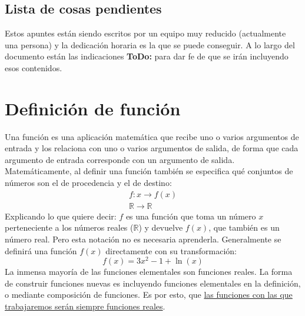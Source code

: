 \documentclass[sans]{apuntes}
\begin{document}
\subsection*{Lista de cosas pendientes}
Estos apuntes están siendo escritos por un equipo muy reducido (actualmente una persona) y la dedicación horaria es la que se puede conseguir. A lo largo del documento están las indicaciones \textbf{ToDo:} para dar fe de que se irán incluyendo esos contenidos.

\newpage
\section{Definición de función} %
Una función es una aplicación matemática que recibe uno o varios argumentos de entrada y los relaciona con uno o varios argumentos de salida, de forma que cada argumento de entrada corresponde con un argumento de salida. Matemáticamente, al definir una función también se especifica qué conjuntos de números son el de procedencia y el de destino:
\[\begin{array}{c} f: x \to f(x) \\
		\mathbb{R} \to \mathbb{R}\end{array}\]
Explicando lo que quiere decir: $f$ es una función que toma un número $x$ perteneciente a los números reales ($\mathbb{R}$) y devuelve $f(x)$, que también es un número real. Pero esta notación no es necesaria aprenderla. Generalmente se definirá una función $f(x)$ directamente con su transformación:
\[f(x) = 3x^2 - 1 + \ln(x)\]
La inmensa mayoría de las funciones elementales son funciones reales. La forma de construir funciones nuevas es incluyendo funciones elementales en la definición, o mediante composición de funciones. Es por esto, que \underline{las funciones con las que trabajaremos serán siempre funciones reales}.
\end{document}

